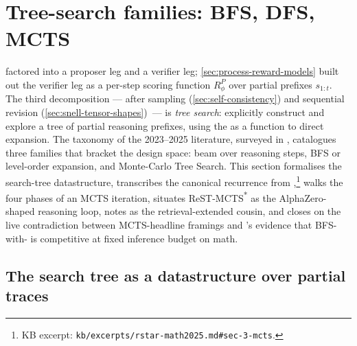 
\section{Tree-search families: BFS, DFS, MCTS}
\label{sec:tree-search}

 factored  into a
proposer leg and a verifier leg; \cref{sec:process-reward-models} built
out the verifier leg as a per-step scoring function $R^P_\phi$ over
partial prefixes $s_{1:t}$. The third decomposition --- after sampling
(\cref{sec:self-consistency}) and sequential revision
(\cref{sec:snell-tensor-shapes})~--- is \emph{tree search}: explicitly
construct and explore a tree of partial reasoning prefixes, using the
 as a  function to direct expansion. The taxonomy of the
2023--2025 literature, surveyed in
\citet{wei2025-tree-search-survey}, catalogues three
families that bracket the design space: beam over reasoning steps, BFS
or level-order expansion, and Monte-Carlo Tree Search. This section
formalises the search-tree datastructure, transcribes the canonical
 recurrence from
\citet{rstar-math2025},\footnote{KB excerpt:
\nolinkurl{kb/excerpts/rstar-math2025.md#sec-3-mcts}.} walks the four
phases of an MCTS iteration, situates ReST-MCTS\textsuperscript{*}
\citep{zhang2024-rest-mcts} as the AlphaZero-shaped reasoning loop,
notes  \citep{hu2025-mcts-rag} as the retrieval-extended
cousin, and closes on the live contradiction between MCTS-headline
framings and \citet[\S 5--6]{snell2024}'s evidence that BFS-with- is
competitive at fixed inference budget on math.

\subsection{The search tree as a datastructure over partial traces}
\label{sec:tree-datastructure}

